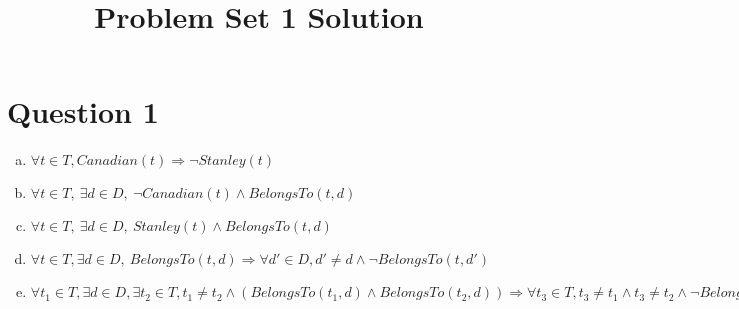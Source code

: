 \documentclass[12pt]{article}
\begin{document}
\title{Problem Set 1 Solution}
\maketitle

\section*{Question 1}
\begin{enumerate}[a.]
    \item $\forall t \in T, Canadian(t) \Rightarrow \neg Stanley(t)$
    \item $\forall t \in T,\:\exists d \in D,\:\neg Canadian(t) \land BelongsTo(t,d)$
    \item $\forall t \in T,\:\exists d \in D,\:Stanley(t) \land BelongsTo(t,d)$
    \item $\forall t \in T, \exists d \in D,\:BelongsTo(t,d) \Rightarrow \forall d' \in D, d' \neq d \land \neg BelongsTo(t,d')$
    \item $\forall t_1 \in T, \exists d \in D, \exists t_2 \in T, t_1 \neq t_2 \land (BelongsTo(t_1, d) \land BelongsTo(t_2,d)) \Rightarrow \forall t_3 \in T, t_3 \neq t_1 \land t_3 \neq t_2 \land \neg BelongsTo(t_3, d)$
\end{enumerate}
\end{document}
